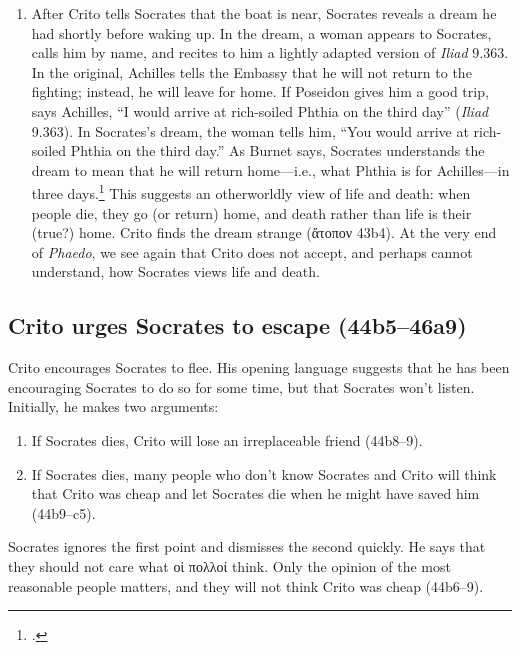 \documentclass[12pt,letterpaper]{article}
\begin{document}
\begin{enumerate}
    \item After Crito tells Socrates that the boat is near, Socrates reveals a dream he had shortly before waking up. In the dream, a woman appears to Socrates, calls him by name, and recites to him a lightly adapted version of \textit{Iliad} 9.363. In the original, Achilles tells the Embassy that he will not return to the fighting; instead, he will leave for home. If Poseidon gives him a good trip, says Achilles, ``I would arrive at rich-soiled Phthia on the third day'' (\textit{Iliad} 9.363). In Socrates's dream, the woman tells him, ``You would arrive at rich-soiled Phthia on the third day.'' As Burnet says, Socrates understands the dream to mean that he will return home---i.e., what Phthia is for Achilles---in three days.\footcite[][on 44b2]{burnet1924-euthyphro-apology-crito} This suggests an otherworldly view of life and death: when people die, they go (or return) home, and death rather than life is their (true?) home. Crito finds the dream strange (\textgreek{ἄτοπον} 43b4). At the very end of \textit{Phaedo}, we see again that Crito does not accept, and perhaps cannot understand, how Socrates views life and death.
\end{enumerate}


\subsection*{Crito urges Socrates to escape (44b5--46a9)}

Crito encourages Socrates to flee. His opening language suggests that he has been encouraging Socrates to do so for some time, but that Socrates won't listen. Initially, he makes two arguments:

\begin{enumerate}

    \item If Socrates dies, Crito will lose an irreplaceable friend
        (44b8--9).

    \item If Socrates dies, many people who don't know Socrates and Crito will think that Crito was cheap and let Socrates die when he might have saved him (44b9--c5).

\end{enumerate}

Socrates ignores the first point and dismisses the second quickly. He says that they should not care what \textgreek{οἱ πολλοί} think. Only the opinion of the most reasonable people matters, and they will not think Crito was cheap (44b6--9).
\end{document}
